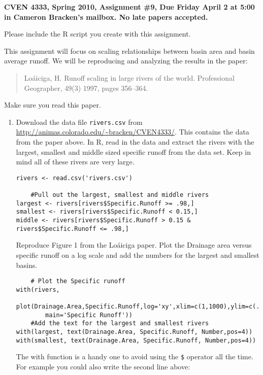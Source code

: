 \documentclass[11pt]{article}
\newcommand{\R}{\textsf{R}}
\begin{document}
\textbf{CVEN 4333, Spring 2010, Assignment \#9, Due Friday April 2 at 5:00 in Cameron Bracken's mailbox. No late papers accepted.}

Please include the \textsf{R} script you create with this assignment.

This assignment will focus on scaling relationships between basin area and basin average runoff.  We will be reproducing and analyzing the results in the paper:  

\begin{quotation}
\noindent Lo\'aiciga, H. Runoff scaling in large rivers of the world. Professional Geographer, 49(3) 1997, pages 356--364.
\end{quotation}

Make sure you read this paper. 

\begin{enumerate}


\item Download the data file \texttt{rivers.csv} from \url{http://animas.colorado.edu/~bracken/CVEN4333/}.  This contains the data from the paper above.  In \R{}, read in the data and extract the rivers with the largest, smallest and middle sized specific runoff from the data set.  Keep in mind all of these rivers are very large.

\begin{verbatim}
rivers <- read.csv('rivers.csv')

    #Pull out the largest, smallest and middle rivers
largest <- rivers[rivers$Specific.Runoff >= .98,]
smallest <- rivers[rivers$Specific.Runoff < 0.15,]
middle <- rivers[rivers$Specific.Runoff > 0.15 & rivers$Specific.Runoff <= .98,]
\end{verbatim}

Reproduce Figure 1 from the Lo\'aiciga paper. Plot the Drainage area versus specific runoff on a log scale and add the numbers for the largest and smallest basins.  

\begin{verbatim}
    # Plot the Specific runoff
with(rivers, 
    plot(Drainage.Area,Specific.Runoff,log='xy',xlim=c(1,1000),ylim=c(.01,10),
        main='Specific Runoff'))
    #Add the text for the largest and smallest rivers
with(largest, text(Drainage.Area, Specific.Runoff, Number,pos=4))
with(smallest, text(Drainage.Area, Specific.Runoff, Number,pos=4))
\end{verbatim}
 
The with function is a handy one to avoid using the \texttt{\$} operator all the time. For example you could also write the second line above:


\end{enumerate}
\end{document}

